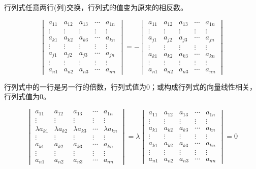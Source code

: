 \begin{corollary}
	行列式任意两行(列)交换，行列式的值变为原来的相反数。
\end{corollary}

$$\begin{vmatrix}
	a_{11} & a_{12} & a_{13} & \cdots & a_{1n}\\
	\vdots & \vdots & \vdots & \vdots & \vdots\\
	a_{k1} & a_{k2} & a_{k3} & \cdots & a_{kn}\\
	\vdots & \vdots & \vdots & \vdots & \vdots\\
	a_{j1} & a_{j2} & a_{j3} & \cdots & a_{jn}\\
	\vdots & \vdots & \vdots & \vdots & \vdots\\
	a_{n1} & a_{n2} & a_{n3} & \cdots & a_{nn}
\end{vmatrix}=-\begin{vmatrix}
	a_{11} & a_{12} & a_{13} & \cdots & a_{1n}\\
	\vdots & \vdots & \vdots & \vdots & \vdots\\
	a_{j1} & a_{j2} & a_{j3} & \cdots & a_{jn}\\
	\vdots & \vdots & \vdots & \vdots & \vdots\\
	a_{k1} & a_{k2} & a_{k3} & \cdots & a_{kn}\\
	\vdots & \vdots & \vdots & \vdots & \vdots\\
	a_{n1} & a_{n2} & a_{n3} & \cdots & a_{nn}
\end{vmatrix}$$

\begin{corollary}
	行列式中的一行是另一行的倍数，行列式值为0；或构成行列式的向量线性相关，行列式值为0。
\end{corollary}

$$\begin{vmatrix}
	a_{11} & a_{12} & a_{13} & \cdots & a_{1n}\\
	\vdots & \vdots & \vdots & \vdots & \vdots\\
	\lambda a_{k1} & \lambda  a_{k2} & \lambda  a_{k3} & \cdots & \lambda  a_{kn}\\
	\vdots & \vdots & \vdots & \vdots & \vdots\\
	a_{k1} & a_{k2} & a_{k3} & \cdots & a_{kn}\\
	\vdots & \vdots & \vdots & \vdots & \vdots\\
	a_{n1} & a_{n2} & a_{n3} & \cdots & a_{nn}
\end{vmatrix}=\lambda \begin{vmatrix}
a_{11} & a_{12} & a_{13} & \cdots & a_{1n}\\
\vdots & \vdots & \vdots & \vdots & \vdots\\
a_{k1} & a_{k2} & a_{k3} & \cdots & a_{kn}\\
\vdots & \vdots & \vdots & \vdots & \vdots\\
a_{k1} & a_{k2} & a_{k3} & \cdots & a_{kn}\\
\vdots & \vdots & \vdots & \vdots & \vdots\\
a_{n1} & a_{n2} & a_{n3} & \cdots & a_{nn}
\end{vmatrix}=0$$

